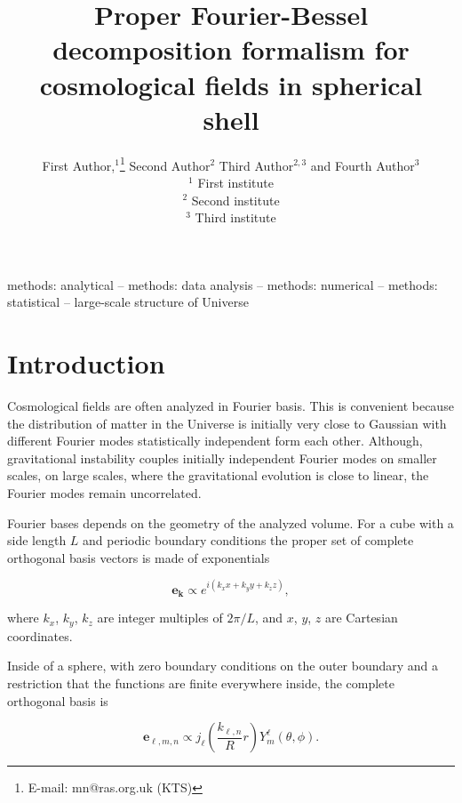 \documentclass[fleqn,usenatbib]{mnras}
\title[Basis for spherical shells]{Proper Fourier-Bessel decomposition formalism for cosmological fields in spherical shell}
\author[First Author et al.]{
First Author,$^{1}$\thanks{E-mail: mn@ras.org.uk (KTS)}
Second Author$^{2}$
Third Author$^{2,3}$
and Fourth Author$^{3}$
\\
$^{1}$ First institute\\
$^{2}$ Second institute\\
$^{3}$ Third institute
}
\begin{document}
\label{firstpage}
\pagerange{\pageref{firstpage}--\pageref{lastpage}}
\maketitle

\begin{abstract}
\end{abstract}

\begin{keywords}
methods: analytical -- methods: data analysis -- methods: numerical -- methods: statistical -- large-scale structure of Universe
\end{keywords}



\section{Introduction}

Cosmological fields are often analyzed in Fourier basis. This is convenient
because the distribution of matter in the Universe is initially very close to
Gaussian with different Fourier modes statistically independent form each other.
Although, gravitational instability couples initially independent Fourier modes
on smaller scales, on large scales, where the gravitational evolution is close
to linear, the Fourier modes remain uncorrelated.

Fourier bases depends on the geometry of the analyzed volume. For a cube with a
side length $L$ and  periodic boundary conditions the proper set of complete
orthogonal basis vectors is made of exponentials 

\begin{equation}
\label{eq:Fcube}
\mathbf{e}_\mathbf{k} \propto e^{i\left(k_xx + k_yy + k_zz\right)},
\end{equation}

where $k_x$, $k_y$, $k_z$ are integer multiples of $2\pi/L$, and $x$, $y$, $z$
are Cartesian coordinates.

Inside of a sphere, with zero boundary conditions on the outer boundary and a
restriction that the functions are finite everywhere inside, the complete
orthogonal basis is

\begin{equation}
\label{eq:Fsphere}
\mathbf{e}_{\ell,m,n} \propto j_\ell\left(\frac{k_{\ell,n}}{R}r\right)Y^\ell_m 
(\theta,\phi).
\end{equation}
\end{document}
